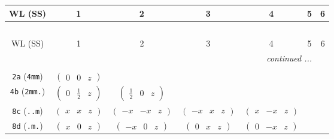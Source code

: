 \documentclass[fleqn,9pt,landscape]{jsarticle}
\begin{document}
\begin{center}
\renewcommand{\arraystretch}{1.2}
\begin{longtable}{ccccccc}
 \hline \hline
WL (SS) & 1 & 2 & 3 & 4 & 5 & 6 \\ \hline \endfirsthead

\multicolumn{6}{l}{\tablename\ \thetable{}} \\
 \hline \hline
WL (SS) & 1 & 2 & 3 & 4 & 5 & 6 \\ \hline \endhead

 \hline \hline
\multicolumn{6}{r}{\footnotesize\it continued ...} \\ \endfoot

 \hline \hline
\multicolumn{6}{r}{} \\ \endlastfoot

{\tt 2a} ({\tt 4mm}) & $ \begin{pmatrix} 0 & 0 & z \end{pmatrix} $ & $  $ & $  $ & $  $ & $  $ & $  $ \\ \hline
{\tt 4b} ({\tt 2mm.}) & $ \begin{pmatrix} 0 & \frac{1}{2} & z \end{pmatrix} $ & $ \begin{pmatrix} \frac{1}{2} & 0 & z \end{pmatrix} $ & $  $ & $  $ & $  $ & $  $ \\ \hline
{\tt 8c} ({\tt ..m}) & $ \begin{pmatrix} x & x & z \end{pmatrix} $ & $ \begin{pmatrix} - x & - x & z \end{pmatrix} $ & $ \begin{pmatrix} - x & x & z \end{pmatrix} $ & $ \begin{pmatrix} x & - x & z \end{pmatrix} $ & $  $ & $  $ \\ \hline
{\tt 8d} ({\tt .m.}) & $ \begin{pmatrix} x & 0 & z \end{pmatrix} $ & $ \begin{pmatrix} - x & 0 & z \end{pmatrix} $ & $ \begin{pmatrix} 0 & x & z \end{pmatrix} $ & $ \begin{pmatrix} 0 & - x & z \end{pmatrix} $ & $  $ & $  $ \\ \hline

\end{longtable}
\end{center}
\end{document}
